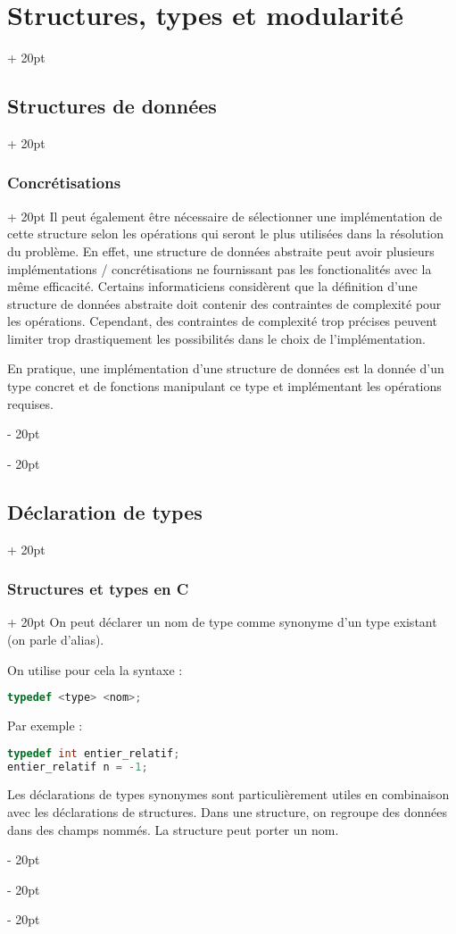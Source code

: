 \documentclass[a4paper, 12pt, twoside]{article}
\newcommand{\ind}[1][20pt]{\advance\leftskip + #1}
\newcommand{\deind}[1][20pt]{\advance\leftskip - #1}
\newenvironment{indt}[2][20pt]{#2 \par \ind[#1]}{\par \deind} %
\begin{document}
\begin{indt}{\section{Structures, types et modularité}}
\begin{indt}{\subsection{Structures de données}}
\begin{indt}{\subsubsection{Concrétisations}}
                Il peut également être nécessaire de sélectionner une implémentation de cette structure selon les opérations qui seront le plus utilisées dans la résolution du problème. En effet, une structure de données abstraite peut avoir plusieurs implémentations / concrétisations ne fournissant pas les fonctionalités avec la même efficacité. Certains informaticiens considèrent que la définition d’une structure de données abstraite doit contenir des contraintes de complexité pour les opérations. Cependant, des contraintes de complexité trop précises peuvent limiter trop drastiquement les possibilités dans le choix de l’implémentation.
                
                En pratique, une implémentation d’une structure de données est la donnée d’un type concret et de fonctions manipulant ce type et implémentant les opérations requises.
            \end{indt}
            
        \end{indt}
            
        \begin{indt}{\subsection{Déclaration de types}}
            \begin{indt}{\subsubsection{Structures et types en C}}
                On peut déclarer un nom de type comme synonyme d’un type existant (on parle d’alias).
                
                On utilise pour cela la syntaxe :
                \begin{lstlisting}[language=C, xleftmargin=80pt]
typedef <type> <nom>;\end{lstlisting}
                
                Par exemple :
                \begin{lstlisting}[language=C, xleftmargin=80pt]
typedef int entier_relatif;
entier_relatif n = -1;\end{lstlisting}
                
                \vspace{6pt}
                
                Les déclarations de types synonymes sont particulièrement utiles en combinaison avec les déclarations de structures. Dans une structure, on regroupe des données dans des champs nommés. La structure peut porter un nom.
                

\end{indt}
\end{indt}
\end{indt}
\end{document}
